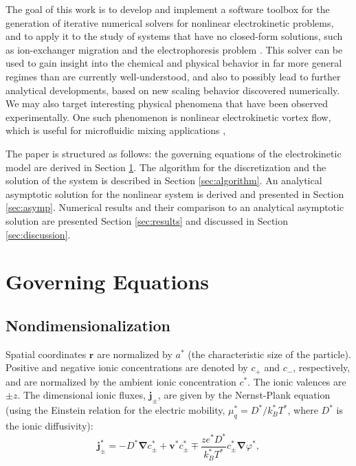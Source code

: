 \documentclass[10pt]{ijnam}
\newcommand\bnabla{\boldsymbol{\nabla}}
\newcommand\bv{\boldsymbol{v}}
\newcommand\bj{\boldsymbol{j}}
\newcommand\br{\boldsymbol{r}}
\begin{document}
The goal of this work is to develop and implement a software toolbox for the generation
of iterative numerical solvers for nonlinear electrokinetic problems, and to apply it to the study
of systems that have no closed-form solutions, such as ion-exchanger migration
\cite{yariv2010migration} and the electrophoresis problem \cite{schnitzer2012surface}.
This solver can be used to gain insight into the chemical and physical behavior 
in far more general regimes than are currently well-understood, 
and also to possibly lead to further analytical developments, based on new scaling behavior
discovered numerically. We may also target interesting physical
phenomena that have been observed experimentally.
One such phenomenon is nonlinear electrokinetic vortex flow, 
which is useful for microfluidic mixing applications \cite{wang2004mix, ben2002vortex},

The paper is structured as follows: the governing equations of the electrokinetic model
are derived in Section \ref{sec:equations}. The algorithm for the discretization and 
the solution of the system is described in Section \ref{sec:algorithm}.
An analytical asymptotic solution for the nonlinear system is derived 
and presented in Section \ref{sec:asymp}.
Numerical results and their comparison to an analytical asymptotic solution 
are presented Section \ref{sec:results} and discussed in Section \ref{sec:discussion}. 

\section{Governing Equations} \label{sec:equations}

\subsection{Nondimensionalization}
Spatial coordinates $\br$ are normalized by $a^*$ 
(the characteristic size of the particle).
Positive and negative ionic concentrations are denoted by $c_+$ and $c_-$, respectively, and
are normalized by the ambient ionic concentration $c^*$. The ionic valences are $\pm z$.
The dimensional ionic fluxes, $\bj_\pm$, are given by the Nernst-Plank equation 
(using the Einstein relation for the electric mobility, $\mu_q^* = D^* / k_B^* T^*$, 
where $D^*$ is the ionic diffusivity):
\begin{equation}
\bj^*_\pm = 
-D^* \bnabla c^*_\pm + \bv^* c^*_\pm \mp \frac{z e^* D^*}{k_B^* T^*} c^*_\pm \bnabla \varphi^*,
\end{equation}
\end{document}

